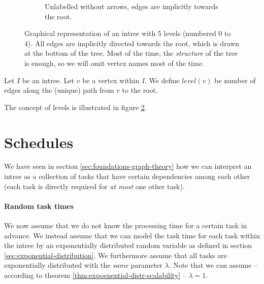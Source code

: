 \begin{figure}[t]
\begin{subfigure}{.45\textwidth}
    \caption{Unlabelled without arrows, edges are implicitly towards the root.}
    \label{fig:intree-example-structure-version}
  \end{subfigure}
  \caption{Graphical representation of an intree with 5 levels (numbered 0 to 4). All edges are implicitly directed towards the root, which is drawn at the bottom of the tree. Most of the time, the \emph{structure} of the tree is enough, so we will omit vertex names most of the time.}
  \label{fig:intrees-introductory-explanation}
\end{figure}

\begin{definition}[Level]
  Let $I$ be an intree. Let $v$ be a vertex within $I$. We define $level(v)$ be number of edges along the (unique) path from $v$ to the root.
\end{definition}

The concept of levels is illustrated in figure \ref{fig:intrees-introductory-explanation}.


\section{Schedules}
\label{sec:introduction-schedules}

We have seen in section \ref{sec:foundations-graph-theory} how we can interpret an intree as a collection of tasks that have certain dependencies among each other (each task is directly required for \emph{at most} one other task). 

\paragraph{Random task times} 

We now assume that we do not know the processing time for a certain task in advance. We instead assume that we can model the task time for each task within the intree by an exponentially distributed random variable as defined in section \ref{sec:exponential-distribution}. We furthermore assume that all tasks are exponentially distributed with the \emph{same} parameter $\lambda$. Note that we can assume -- according to theorem \ref{thm:expoenential-distr-scalability} -- $\lambda=1$.

